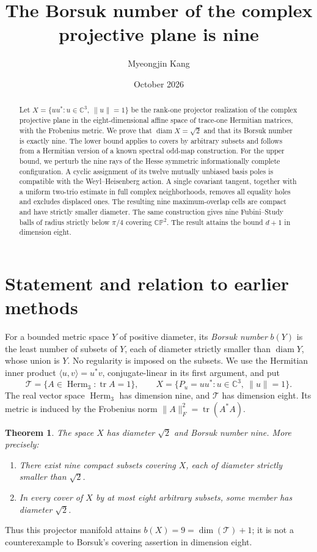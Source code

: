 \documentclass[11pt,a4paper]{article}
\title{The Borsuk number of the complex projective plane is nine}
\author{Myeongjin Kang}
\date{October 2026}
\newtheorem{maintheorem}{Theorem}
\theoremstyle{remark}
\numberwithin{equation}{section}
\newcommand{\C}{\mathbb C}
\newcommand{\CP}{\mathbb{CP}}
\newcommand{\Herm}{\operatorname{Herm}}
\newcommand{\tr}{\operatorname{tr}}
\newcommand{\diam}{\operatorname{diam}}
\newcommand{\ip}[2]{\langle #1,#2\rangle}
\newcommand{\norm}[1]{\lVert #1\rVert}
\begin{document}
\maketitle
\begin{abstract}
Let $X=\{uu^*:u\in\C^3,\ \norm{u}=1\}$ be the rank-one projector realization of the complex projective plane in the eight-dimensional affine space of trace-one Hermitian matrices, with the Frobenius metric. We prove that $\diam X=\sqrt2$ and that its Borsuk number is exactly nine. The lower bound applies to covers by arbitrary subsets and follows from a Hermitian version of a known spectral odd-map construction. For the upper bound, we perturb the nine rays of the Hesse symmetric informationally complete configuration. A cyclic assignment of its twelve mutually unbiased basis poles is compatible with the Weyl--Heisenberg action. A single covariant tangent, together with a uniform two-trio estimate in full complex neighborhoods, removes all equality holes and excludes displaced ones. The resulting nine maximum-overlap cells are compact and have strictly smaller diameter. The same construction gives nine Fubini--Study balls of radius strictly below $\pi/4$ covering $\CP^2$. The result attains the bound $d+1$ in dimension eight.
\end{abstract}

\section{Statement and relation to earlier methods}
For a bounded metric space $Y$ of positive diameter, its \emph{Borsuk number} $b(Y)$ is the least number of subsets of $Y$, each of diameter strictly smaller than $\diam Y$, whose union is $Y$. No regularity is imposed on the subsets. We use the Hermitian inner product $\ip uv=u^*v$, conjugate-linear in its first argument, and put
\[
 \mathcal T=\{A\in\Herm_3:\tr A=1\},\qquad
 X=\{P_u=uu^*:u\in\C^3,\ \norm u=1\}.
\]
The real vector space $\Herm_3$ has dimension nine, and $\mathcal T$ has dimension eight. Its metric is induced by the Frobenius norm $\norm A_F^2=\tr(A^*A)$.

\begin{maintheorem}\label{thm:main}
The space $X$ has diameter $\sqrt2$ and Borsuk number nine. More precisely:
\begin{enumerate}
\item There exist nine compact subsets covering $X$, each of diameter strictly smaller than $\sqrt2$.
\item In every cover of $X$ by at most eight arbitrary subsets, some member has diameter $\sqrt2$.
\end{enumerate}
\end{maintheorem}
Thus this projector manifold attains $b(X)=9=\dim(\mathcal T)+1$; it is not a counterexample to Borsuk's covering assertion in dimension eight.
\end{document}
